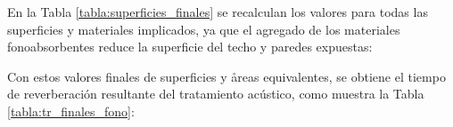 		En la Tabla \ref{tabla:superficies_finales} se recalculan los valores para todas las superficies y materiales implicados, ya que el agregado de los materiales fonoabsorbentes reduce la superficie del techo y paredes expuestas:
		
		\begin{table}[H]
			\centering
			\caption{Cantidades y superficies finales usadas para los materiales y muebles de la sala.}
			\label{tabla:superficies_finales}
		\end{table}
		
		Con estos valores finales de superficies y åreas equivalentes, se obtiene el tiempo de reverberación resultante del tratamiento acústico, como muestra la Tabla \ref{tabla:tr_finales_fono}:

